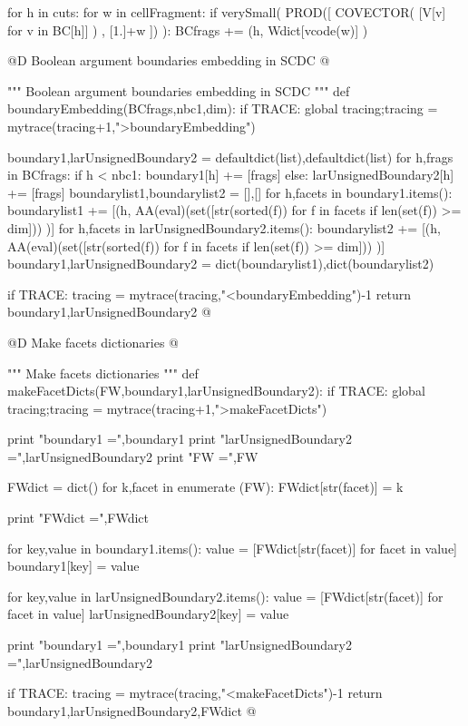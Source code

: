 \documentclass[11pt,oneside]{article}	%
\begin{document}
for h in cuts:
	for w in cellFragment:
		if verySmall( PROD([ COVECTOR( [V[v] for v in BC[h]] ) , [1.]+w ]) ):
			BCfrags += (h, Wdict[vcode(w)] )

@D Boolean argument boundaries embedding in SCDC
@{""" Boolean argument boundaries embedding in SCDC """
def boundaryEmbedding(BCfrags,nbc1,dim):
	if TRACE: global tracing;tracing = mytrace(tracing+1,">boundaryEmbedding")

	boundary1,larUnsignedBoundary2 = defaultdict(list),defaultdict(list)						 
	for h,frags in BCfrags:
		if h < nbc1: boundary1[h] += [frags]
		else: larUnsignedBoundary2[h] += [frags]	
	boundarylist1,boundarylist2 = [],[]
	for h,facets in boundary1.items():
		boundarylist1 += [(h, AA(eval)(set([str(sorted(f)) 
							for f in facets if len(set(f)) >= dim])) )]
	for h,facets in larUnsignedBoundary2.items():
		boundarylist2 += [(h, AA(eval)(set([str(sorted(f)) 
							for f in facets if len(set(f)) >= dim])) )]
	boundary1,larUnsignedBoundary2 = dict(boundarylist1),dict(boundarylist2)

	if TRACE: tracing = mytrace(tracing,"<boundaryEmbedding")-1
	return boundary1,larUnsignedBoundary2
@}


@D Make facets dictionaries
@{""" Make facets dictionaries """
def makeFacetDicts(FW,boundary1,larUnsignedBoundary2):
	if TRACE: global tracing;tracing = mytrace(tracing+1,">makeFacetDicts")
	
	print "boundary1 =",boundary1
	print "larUnsignedBoundary2 =",larUnsignedBoundary2
	print "FW =",FW
	
	FWdict = dict()
	for k,facet in enumerate (FW): FWdict[str(facet)] = k
	
	print "FWdict =",FWdict

	for key,value in boundary1.items():
		value = [FWdict[str(facet)] for facet in value]
		boundary1[key] = value
		
	for key,value in larUnsignedBoundary2.items():
		value = [FWdict[str(facet)] for facet in value]
		larUnsignedBoundary2[key] = value

	print "boundary1 =",boundary1
	print "larUnsignedBoundary2 =",larUnsignedBoundary2

	if TRACE: tracing = mytrace(tracing,"<makeFacetDicts")-1
	return boundary1,larUnsignedBoundary2,FWdict
@}
\end{document}
